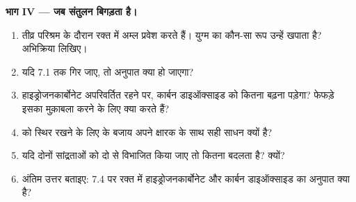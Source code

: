 \begin{problem}
\medskip
\noindent\textbf{भाग IV --- जब संतुलन बिगड़ता है।}
\begin{enumerate}[resume]
  \item तीव्र परिश्रम के दौरान रक्त में अम्ल प्रवेश करते हैं। युग्म का कौन-सा रूप
        उन्हें खपाता है? अभिक्रिया लिखिए।
  \item यदि  7.1 तक गिर जाए, तो अनुपात क्या हो जाएगा?
  \item हाइड्रोजनकार्बोनेट अपरिवर्तित रहने पर, कार्बन
        डाइऑक्साइड को कितना बढ़ना पड़ेगा? फेफड़े इसका मुक़ाबला करने के लिए क्या करते हैं?
  \item {} को स्थिर रखने के लिए  के बजाय अपने क्षारक के साथ 
        सही साधन क्यों है?
  \item यदि दोनों सांद्रताओं को दो से विभाजित किया जाए तो  कितना बदलता है?
        क्यों?
  \item अंतिम उत्तर बताइए:  7.4 पर रक्त में हाइड्रोजनकार्बोनेट और कार्बन
        डाइऑक्साइड का अनुपात क्या है?
\end{enumerate}
\end{problem}
